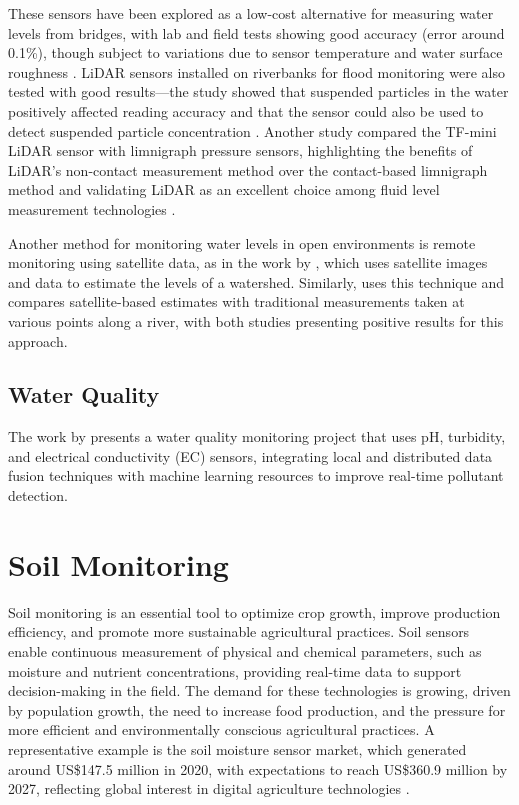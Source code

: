 \documentclass[conference]{IEEEtran}
\begin{document}
These sensors have been explored as a low-cost alternative for measuring water levels from bridges, with lab and field tests showing good accuracy (error around 0.1\%), though subject to variations due to sensor temperature and water surface roughness \cite{paul_2020_a}. LiDAR sensors installed on riverbanks for flood monitoring were also tested with good results—the study showed that suspended particles in the water positively affected reading accuracy and that the sensor could also be used to detect suspended particle concentration \cite{tamari_2016_flash}. Another study compared the TF-mini LiDAR sensor with limnigraph pressure sensors, highlighting the benefits of LiDAR’s non-contact measurement method over the contact-based limnigraph method and validating LiDAR as an excellent choice among fluid level measurement technologies \cite{santana_2024_development}.

Another method for monitoring water levels in open environments is remote monitoring using satellite data, as in the work by \cite{jiang_2024_monitoring}, which uses satellite images and data to estimate the levels of a watershed. Similarly, \cite{ali_2024_satellite} uses this technique and compares satellite-based estimates with traditional measurements taken at various points along a river, with both studies presenting positive results for this approach.

\subsection{Water Quality}

The work by \cite{ferreira_2023_conception} presents a water quality monitoring project that uses pH, turbidity, and electrical conductivity (EC) sensors, integrating local and distributed data fusion techniques with machine learning resources to improve real-time pollutant detection.

\section{Soil Monitoring}

Soil monitoring is an essential tool to optimize crop growth, improve production efficiency, and promote more sustainable agricultural practices. Soil sensors enable continuous measurement of physical and chemical parameters, such as moisture and nutrient concentrations, providing real-time data to support decision-making in the field. The demand for these technologies is growing, driven by population growth, the need to increase food production, and the pressure for more efficient and environmentally conscious agricultural practices. A representative example is the soil moisture sensor market, which generated around US\$147.5 million in 2020, with expectations to reach US\$360.9 million by 2027, reflecting global interest in digital agriculture technologies \cite{yin_2021_smart}.
\end{document}
